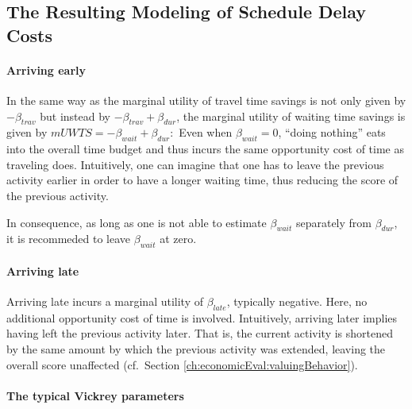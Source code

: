 
\subsection{The Resulting Modeling of Schedule Delay Costs}
\label{sec:schedule-delay-costs}

\paragraph{Arriving early}

In the same way as the marginal utility of travel time savings is not only given by $- \beta_{trav}$ but instead by $- \beta_{trav} + \beta_{dur}$, the marginal utility of waiting time savings is given by 
$
mUWTS = - \beta_{wait} + \beta_{dur}: 
$
Even when $\beta_{wait} = 0$, ``doing nothing'' eats into the overall time budget and thus incurs the same opportunity cost of time as traveling does.  
%
Intuitively, one can imagine that one has to leave the previous activity earlier in order to have a longer waiting time, thus reducing the score of the previous activity.

In consequence, as long as one is not able to estimate $\beta_{wait}$ separately from $\beta_{dur}$, it is recommeded to leave $\beta_{wait}$ at zero.

\paragraph{Arriving late}

Arriving late incurs a marginal utility of $\beta_{late}$, typically negative.  Here, no additional opportunity cost of time is involved. Intuitively, arriving later implies having left the previous activity later.  That is, the current activity is shortened by the same amount by which the previous activity was extended, leaving the overall score unaffected (cf.\ Section \ref{ch:economicEval:valuingBehavior}). 

\paragraph{The typical Vickrey parameters}

